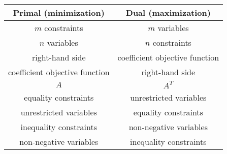 \begin{table}[H]
    \centering
    \begin{tabular}{cc}
    \hline
    \textbf{Primal (minimization)} & \textbf{Dual (maximization)}   \\ \hline
    $m$ constraints                & $m$ variables                  \\
    $n$ variables                  & $n$ constraints                \\
    right-hand side                & coefficient objective function \\
    coefficient objective function & right-hand side                \\
    $A$                            & $A^T$                          \\
    equality constraints           & unrestricted variables         \\
    unrestricted variables         & equality constraints           \\
    inequality constraints         & non-negative variables         \\
    non-negative variables         & inequality constraints         \\ \hline
    \end{tabular}
\end{table}

